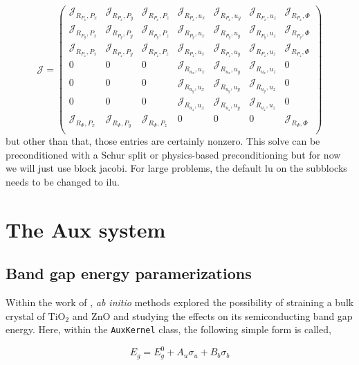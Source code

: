 \documentclass[16pt]{article} %
\begin{document}
$$ \mathscr{J}  = \begin{pmatrix}
\mathscr{J}_{R_{P_x}, P_x} &\mathscr{J}_{R_{P_x},P_y}&\mathscr{J}_{R_{P_x},P_z} &\mathscr{J}_{R_{P_x}, u_x}& \mathscr{J}_{R_{P_x},u_y} &\mathscr{J}_{R_{P_x},u_z} & \mathscr{J}_{R_{P_x},\Phi}\\
\mathscr{J}_{R_{P_y}, P_x} &\mathscr{J}_{R_{P_y},P_y}&\mathscr{J}_{R_{P_y},P_z} &\mathscr{J}_{R_{P_y}, u_x}& \mathscr{J}_{R_{P_y},u_y} &\mathscr{J}_{R_{P_y},u_z} & \mathscr{J}_{R_{P_y},\Phi}\\
\mathscr{J}_{R_{P_z}, P_x} &\mathscr{J}_{R_{P_z},P_y}&\mathscr{J}_{R_{P_z},P_z} &\mathscr{J}_{R_{P_z}, u_x}& \mathscr{J}_{R_{P_z},u_y} &\mathscr{J}_{R_{P_z},u_z} & \mathscr{J}_{R_{P_z},\Phi}\\
0&0&0 &\mathscr{J}_{R_{u_x}, u_x}& \mathscr{J}_{R_{u_x},u_y} &\mathscr{J}_{R_{u_x},u_z} & 0\\
0 &0&0 &\mathscr{J}_{R_{u_y}, u_x}& \mathscr{J}_{R_{u_y},u_y} &\mathscr{J}_{R_{u_y},u_z} & 0\\
0 &0&0&\mathscr{J}_{R_{u_z}, u_x}& \mathscr{J}_{R_{u_z},u_y} &\mathscr{J}_{R_{u_z},u_z} & 0\\
\mathscr{J}_{R_{\Phi}, P_x} &\mathscr{J}_{R_{\Phi},P_y}&\mathscr{J}_{R_{\Phi},P_z} & 0 & 0 & 0 & \mathscr{J}_{R_{\Phi},\Phi}\\
 \end{pmatrix} $$
\normalsize
but other than that, those entries are certainly nonzero. 
%
This solve can be preconditioned with a Schur split or physics-based preconditioning but for now we will just use block jacobi.
%
For large problems, the default lu on the subblocks needs to be changed to ilu.


\section{The Aux system}

\subsection{Band gap energy paramerizations}

Within the work of \cite{Yin2010, Wagner2013}, \emph{ab initio} methods explored the possibility of straining a bulk crystal of $\mathrm{TiO}_2$ and $\mathrm{ZnO}$ and studying the effects on its semiconducting band gap energy. Here, within the \texttt{AuxKernel} class, the following simple form is called,

$$ E_g = E_g^0 + A_u \sigma_u + B_b \sigma_b$$
\end{document}
